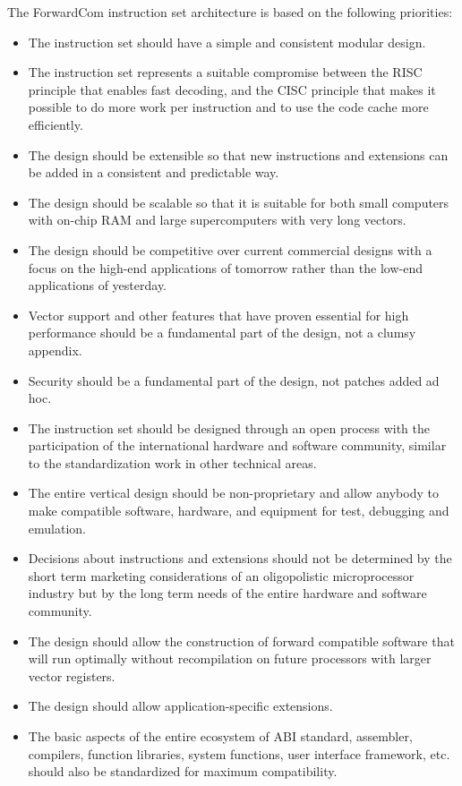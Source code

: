 \documentclass[forwardcom.tex]{subfiles}
\begin{document}
The ForwardCom instruction set architecture is based on the following priorities:
\begin{itemize}
\item The instruction set should have a simple and consistent modular design.
\item The instruction set represents a suitable compromise between the RISC principle that enables fast decoding, and the CISC principle that makes it possible to do more work per instruction and to use the code cache more efficiently.
\item The design should be extensible so that new instructions and extensions can be added in a consistent and predictable way.
\item The design should be scalable so that it is suitable for both small computers with on-chip RAM and large supercomputers with very long vectors.
\item The design should be competitive over current commercial designs with a focus on the high-end applications of tomorrow rather than the low-end applications of yesterday.
\item Vector support and other features that have proven essential for high performance should be a fundamental part of the design, not a clumsy appendix.
\item Security should be a fundamental part of the design, not patches added ad hoc.
\item The instruction set should be designed through an open process with the participation of the international hardware and software community, similar to the standardization work in other technical areas.
\item The entire vertical design should be non-proprietary and allow anybody to make compatible software, hardware, and equipment for test, debugging and emulation.
\item Decisions about instructions and extensions should not be determined by the short term marketing considerations of an oligopolistic microprocessor industry but by the long term needs of the entire hardware and software community.
\item The design should allow the construction of forward compatible software that will run optimally without recompilation on future processors with larger vector registers.
\item The design should allow application-specific extensions.
\item The basic aspects of the entire ecosystem of ABI standard, assembler, compilers, function libraries, system functions, user interface framework, etc. should also be standardized for maximum compatibility.
\end{itemize}
\end{document}
